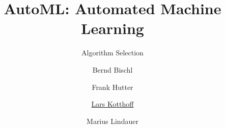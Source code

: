 




\title[AutoML: Overview]{AutoML: Automated Machine Learning}
\subtitle{Algorithm Selection}
\author[Lars Kotthoff]{Bernd Bischl \and Frank Hutter \and \underline{Lars Kotthoff} \and Marius Lindauer}
\institute{}
\date{}





	
	\maketitle
	

